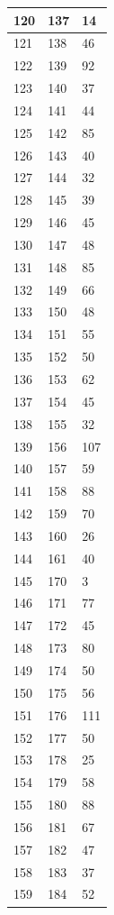 \begin{tabular}{p{}p{}p{}}
\hline
120 & 137 & 14 \\
\hline
121 & 138 & 46 \\
\hline
122 & 139 & 92 \\
\hline
123 & 140 & 37 \\
\hline
124 & 141 & 44 \\
\hline
125 & 142 & 85 \\
\hline
126 & 143 & 40 \\
\hline
127 & 144 & 32 \\
\hline
128 & 145 & 39 \\
\hline
129 & 146 & 45 \\
\hline
130 & 147 & 48 \\
\hline
131 & 148 & 85 \\
\hline
132 & 149 & 66 \\
\hline
133 & 150 & 48 \\
\hline
134 & 151 & 55 \\
\hline
135 & 152 & 50 \\
\hline
136 & 153 & 62 \\
\hline
137 & 154 & 45 \\
\hline
138 & 155 & 32 \\
\hline
139 & 156 & 107 \\
\hline
140 & 157 & 59 \\
\hline
141 & 158 & 88 \\
\hline
142 & 159 & 70 \\
\hline
143 & 160 & 26 \\
\hline
144 & 161 & 40 \\
\hline
145 & 170 & 3 \\
\hline
146 & 171 & 77 \\
\hline
147 & 172 & 45 \\
\hline
148 & 173 & 80 \\
\hline
149 & 174 & 50 \\
\hline
150 & 175 & 56 \\
\hline
151 & 176 & 111 \\
\hline
152 & 177 & 50 \\
\hline
153 & 178 & 25 \\
\hline
154 & 179 & 58 \\
\hline
155 & 180 & 88 \\
\hline
156 & 181 & 67 \\
\hline
157 & 182 & 47 \\
\hline
158 & 183 & 37 \\
\hline
159 & 184 & 52 \\

\end{tabular}
